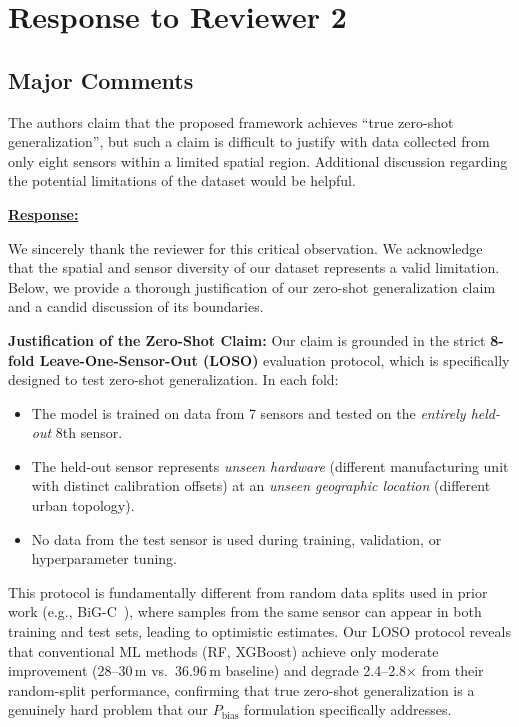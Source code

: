 \newpage
\section{Response to Reviewer 2}

\subsection{Major Comments}

\begin{cmttwo}{}{}
The authors claim that the proposed framework achieves ``true zero-shot generalization'', but such a claim is difficult to justify with data collected from only eight sensors within a limited spatial region. Additional discussion regarding the potential limitations of the dataset would be helpful.

\end{cmttwo}

\vspace{0.1cm}
\noindent
\underline{\textbf{Response:}}
\vspace{0.2cm}

We sincerely thank the reviewer for this critical observation. We acknowledge that the spatial and sensor diversity of our dataset represents a valid limitation. Below, we provide a thorough justification of our zero-shot generalization claim and a candid discussion of its boundaries.

\textbf{Justification of the Zero-Shot Claim:}
Our claim is grounded in the strict \textbf{8-fold Leave-One-Sensor-Out (LOSO)} evaluation protocol, which is specifically designed to test zero-shot generalization. In each fold:
\begin{itemize}
    \item The model is trained on data from 7 sensors and tested on the \emph{entirely held-out} 8th sensor.
    \item The held-out sensor represents \emph{unseen hardware} (different manufacturing unit with distinct calibration offsets) at an \emph{unseen geographic location} (different urban topology).
    \item No data from the test sensor is used during training, validation, or hyperparameter tuning.
\end{itemize}

This protocol is fundamentally different from random data splits used in prior work (e.g., BiG-C~\cite{narayanan2022enhanced}), where samples from the same sensor can appear in both training and test sets, leading to optimistic estimates. Our LOSO protocol reveals that conventional ML methods (RF, XGBoost) achieve only moderate improvement (28--30\,m vs.\ 36.96\,m baseline) and degrade 2.4--2.8$\times$ from their random-split performance, confirming that true zero-shot generalization is a genuinely hard problem that our $P_{\text{bias}}$ formulation specifically addresses.

